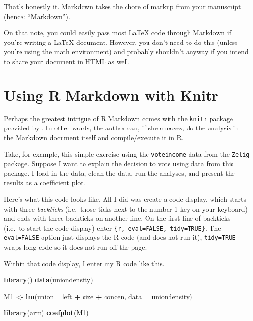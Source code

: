 \documentclass[10pt,a4paper]{article}
\newenvironment{Shaded}{\begin{snugshade}}{\end{snugshade}}
\newcommand{\DataTypeTok}[1]{\textcolor[rgb]{0.13,0.29,0.53}{#1}}
\newcommand{\KeywordTok}[1]{\textcolor[rgb]{0.13,0.29,0.53}{\textbf{#1}}}
\newcommand{\NormalTok}[1]{#1}
\newcommand{\OperatorTok}[1]{\textcolor[rgb]{0.81,0.36,0.00}{\textbf{#1}}}
\newcommand{\StringTok}[1]{\textcolor[rgb]{0.31,0.60,0.02}{#1}}
\begin{document}
That's honestly it. Markdown takes the chore of markup from your
manuscript (hence: ``Markdown'').

On that note, you could easily pass most LaTeX code through Markdown if
you're writing a LaTeX document. However, you don't need to do this
(unless you're using the math environment) and probably shouldn't anyway
if you intend to share your document in HTML as well.

\hypertarget{using-r-markdown-with-knitr}{%
\section{Using R Markdown with
Knitr}\label{using-r-markdown-with-knitr}}

Perhaps the greatest intrigue of R Markdown comes with the
\href{http://yihui.name/knitr/}{\texttt{knitr} package} provided by
\citet{xie2013ddrk}. In other words, the author can, if she chooses, do
the analysis in the Markdown document itself and compile/execute it in
R.

Take, for example, this simple exercise using the \texttt{voteincome}
data from the \texttt{Zelig} package. Suppose I want to explain the
decision to vote using data from this package. I load in the data, clean
the data, run the analyses, and present the results as a coefficient
plot.

Here's what this code looks like. All I did was create a code display,
which starts with three \emph{backticks} (i.e.~those ticks next to the
number 1 key on your keyboard) and ends with three backticks on another
line. On the first line of backticks (i.e.~to start the code display)
enter \texttt{\{r,\ eval=FALSE,\ tidy=TRUE\}}. The \texttt{eval=FALSE}
option just displays the R code (and does not run it),
\texttt{tidy=TRUE} wraps long code so it does not run off the page.

Within that code display, I enter my R code like this.

\begin{Shaded}
\begin{Highlighting}[]
\KeywordTok{library}\NormalTok{()}
\KeywordTok{data}\NormalTok{(uniondensity)}

\NormalTok{M1 <-}\StringTok{ }\KeywordTok{lm}\NormalTok{(union }\OperatorTok{~}\StringTok{ }\NormalTok{left }\OperatorTok{+}\StringTok{ }
\StringTok{    }\NormalTok{size }\OperatorTok{+}\StringTok{ }\NormalTok{concen, }\DataTypeTok{data =}\NormalTok{ uniondensity)}

\KeywordTok{library}\NormalTok{(arm)}
\KeywordTok{coefplot}\NormalTok{(M1)}
\end{Highlighting}
\end{Shaded}
\end{document}
